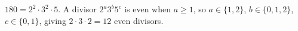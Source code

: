 $180=2^2\cdot3^2\cdot5$. A divisor $2^a3^b5^c$ is even when $a\ge1$, so $a\in\{1,2\}$, $b\in\{0,1,2\}$, $c\in\{0,1\}$, giving $2\cdot3\cdot2=\boxed{12}$ even divisors.
